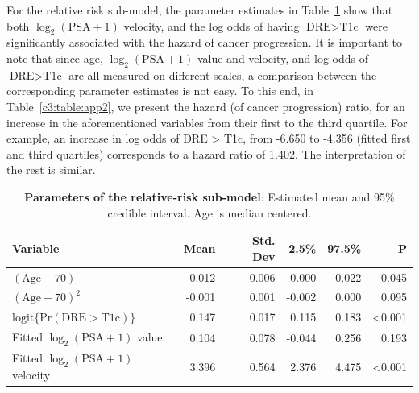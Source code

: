 \begin{subappendices}
For the relative risk sub-model, the parameter estimates in Table~\ref{c3:table:app1} show that both ${\log_2 (\mbox{PSA} + 1)}$ velocity, and the log odds of having ${\mbox{DRE} > \mbox{T1c}}$ were significantly associated with the hazard of cancer progression. It is important to note that since age, ${\log_2 (\mbox{PSA} + 1)}$ value and velocity, and log odds of ${\mbox{DRE} > \mbox{T1c}}$ are all measured on different scales, a comparison between the corresponding parameter estimates is not easy. To this end, in Table~\ref{c3:table:app2}, we present the hazard (of cancer progression) ratio, for an increase in the aforementioned variables from their first to the third quartile. For example, an increase in log odds of DRE > T1c, from -6.650 to -4.356 (fitted first and third quartiles) corresponds to a hazard ratio of 1.402. The interpretation of the rest is similar.

\begin{table}
\small
\centering
\caption{\textbf{Parameters of the relative-risk sub-model}: Estimated mean and 95\% credible interval. Age is median centered.}
\label{c3:table:app1}
\begin{tabular}{lrrrrr}
\toprule
Variable                      & Mean   & Std. Dev & 2.5\%  & 97.5\%                 & P              \\
\midrule
$(\mbox{Age} - 70)$                      & 0.012    & 0.006 & 0.000 & 0.022  & 0.045 \\
$(\mbox{Age} - 70)^2$ & -0.001   & 0.001 & -0.002 & 0.000      & 0.095 \\
$\mbox{logit} \big\{\mbox{Pr}(\mbox{DRE} > \mbox{T1c})\big\}$                 & 0.147    & 0.017 & 0.115  & 0.183  & \textless0.001     \\
Fitted $\log_2 (\mbox{PSA} + 1)$ value            & 0.104    & 0.078 & -0.044 & 0.256  & 0.193 \\
Fitted $\log_2 (\mbox{PSA} + 1)$ velocity             & 3.396    & 0.564 & 2.376  & 4.475  & \textless0.001   \\
\bottomrule
\end{tabular}
\end{table}


\end{subappendices}
